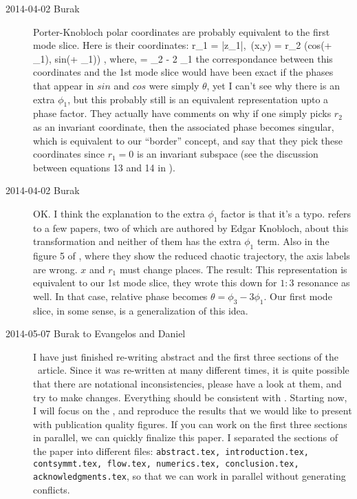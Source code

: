 \begin{description}
\item[2014-04-02 Burak] Porter-Knobloch polar coordinates are probably
equivalent to the first mode slice. Here is their coordinates:
\beq
	r_1 = |z_1|,\, (x,y) = r_2 (cos(\theta + \phi_1), sin(\theta + \phi_1))
	, \mbox{where}, \theta = \phi_2 - 2 \phi_1
\eeq
the correspondance between this coordinates and the 1st mode slice would
have been exact if the phases that appear in $sin$ and $cos$ were simply
$\theta$, yet I can't see why there is an extra $\phi_1$, but this probably
still is an equivalent representation upto a phase factor. They actually
have comments on why if one simply picks $r_2$ as an invariant coordinate,
then the associated phase becomes singular, which is equivalent to our
``border'' concept, and say that they pick these coordinates since $r_1=0$
is an invariant subspace (see the discussion between equations 13 and 14 in
).

\item[2014-04-02 Burak] OK. I think the explanation to the extra $\phi_1$
factor is that it's a typo.  refers to a few papers, two
of which are authored by Edgar Knobloch, about this transformation and neither
of them  has the extra $\phi_1$ term. Also in the figure 5 of ,
where they show the reduced chaotic trajectory, the axis labels are wrong.
$x$ and $r_1$ must change places. The result: This representation is equivalent
to our 1st mode slice, they wrote this down for $1:3$ resonance as well.
In that case, relative phase becomes $\theta = \phi_3 - 3 \phi_1$. Our first
mode slice, in some sense, is a generalization of this idea.

\item[2014-05-07 Burak to Evangelos and Daniel] I have just finished re-writing
abstract and the first three sections of the \twoMode\ article. Since it
was re-written at many different times, it is quite possible that there are
notational inconsistencies, please have a look at them, and try to make
changes. Everything should be consistent with .
Starting now, I will focus on the , and reproduce
the results that we would like to present with publication quality figures.
If you can work on the first three sections in parallel, we can quickly
finalize this paper. I separated the sections of the paper into different
files: \texttt{abstract.tex, introduction.tex, contsymmt.tex, flow.tex,
numerics.tex, conclusion.tex, acknowledgments.tex}, so that we
can work in parallel without generating conflicts.


\end{description}
